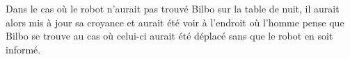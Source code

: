 \documentclass[a4paper,11pt,twoside]{StyleThese}
\begin{document}
Dans le cas où le robot n'aurait pas trouvé Bilbo sur la table de nuit, il aurait alors mis à jour sa croyance et aurait été voir à l'endroit où l'homme pense que Bilbo se trouve au cas où celui-ci aurait été déplacé sans que le robot en soit informé.






\end{document}

